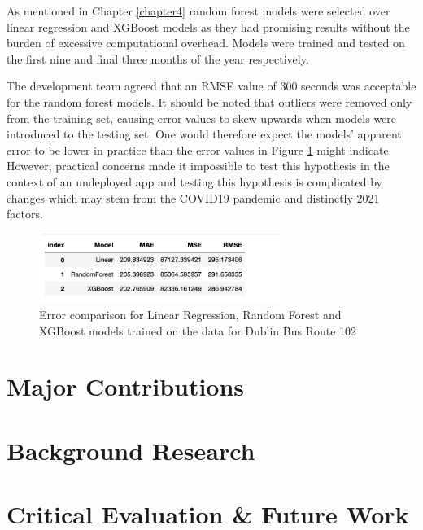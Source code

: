 \documentclass[]{UCD_CS_47360_Report}
\begin{document}
As mentioned in Chapter \ref{chapter4} random forest models were selected over linear regression and XGBoost models as they had promising results without the burden of excessive computational overhead.
Models were trained and tested on the first nine and final three months of the year respectively.

The development team agreed that an RMSE value of 300 seconds was acceptable for the random forest models.
It should be noted that outliers were removed only from the training set, causing error values to skew upwards when models were introduced to the testing set.
One would therefore expect the models' apparent error to be lower in practice than the error values in Figure \ref{fig:modelComparison} might indicate.
However, practical concerns made it impossible to test this hypothesis in the context of an undeployed app and testing this hypothesis is complicated by changes which may stem from the COVID19 pandemic and distinctly 2021 factors.

\begin{figure}[!htb]
    \centering
    \includegraphics[width=0.7\textwidth]{figures/route_102_model_comparison.png}
    \caption{Error comparison for Linear Regression, Random Forest and XGBoost models trained on the data for Dublin Bus Route 102}
    \label{fig:modelComparison}
\end{figure}


\chapter{\label{chapter6}Major Contributions}


\chapter{\label{chapter7}Background Research}



\chapter{\label{chapter8} Critical Evaluation \& Future Work}
\end{document}
